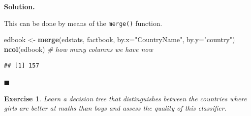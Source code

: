\documentclass[10pt,b5paper,krantz1]{krantz}
\newenvironment{Shaded}{\begin{snugshade}}{\end{snugshade}}
\newcommand{\CommentTok}[1]{\textcolor[rgb]{0.37,0.37,0.37}{\textit{#1}}}
\newcommand{\DataTypeTok}[1]{\textcolor[rgb]{0.27,0.27,0.27}{#1}}
\newcommand{\KeywordTok}[1]{\textcolor[rgb]{0.27,0.27,0.27}{\textbf{#1}}}
\newcommand{\NormalTok}[1]{#1}
\newcommand{\StringTok}[1]{\textcolor[rgb]{0.5,0.5,0.5}{#1}}
\newtheorem{exercise}{Exercise}[chapter]
\newenvironment{solution}{%
\bigskip\noindent\textbf{Solution. }%
\it\ignorespaces%
\ignorespaces%
}{\ignorespaces%
\hfill$\blacksquare$%
}
\begin{document}
\begin{solution}

This can be done by means of the \texttt{merge()} function.

\begin{Shaded}
\begin{Highlighting}[]
\NormalTok{edbook <-}\StringTok{ }\KeywordTok{merge}\NormalTok{(edstats, factbook, }\DataTypeTok{by.x=}\StringTok{"CountryName"}\NormalTok{, }\DataTypeTok{by.y=}\StringTok{"country"}\NormalTok{)}
\KeywordTok{ncol}\NormalTok{(edbook) }\CommentTok{# how many columns we have now}
\end{Highlighting}
\end{Shaded}

\begin{verbatim}
## [1] 157
\end{verbatim}

\end{solution}

\begin{exercise}

Learn a decision tree that distinguishes between the countries where
girls are better at maths than boys and assess the quality of this classifier.

\end{exercise}
\end{document}
